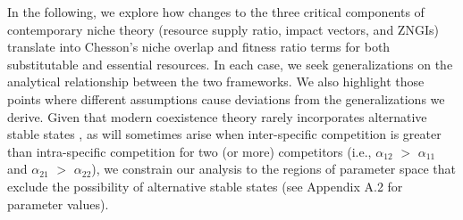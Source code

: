 In the following, we explore how changes to the three critical components of contemporary niche theory (resource supply ratio, impact vectors, and ZNGIs) translate into Chesson's niche overlap and fitness ratio terms for both substitutable and essential resources. In each case, we seek generalizations on the analytical relationship between the two frameworks. We also highlight those points where different assumptions cause deviations from the generalizations we derive. Given that modern coexistence theory rarely incorporates alternative stable states \citep[but see][]{Chesson2008}, as will sometimes arise when inter-specific competition is greater than intra-specific competition for two (or more) competitors (i.e., $\alpha_{12}$ $>$ $\alpha_{11}$ and $\alpha_{21}$ $>$ $\alpha_{22}$), we constrain our analysis to the regions of parameter space that exclude the possibility of alternative stable states (see Appendix A.2 for parameter values).
\par



